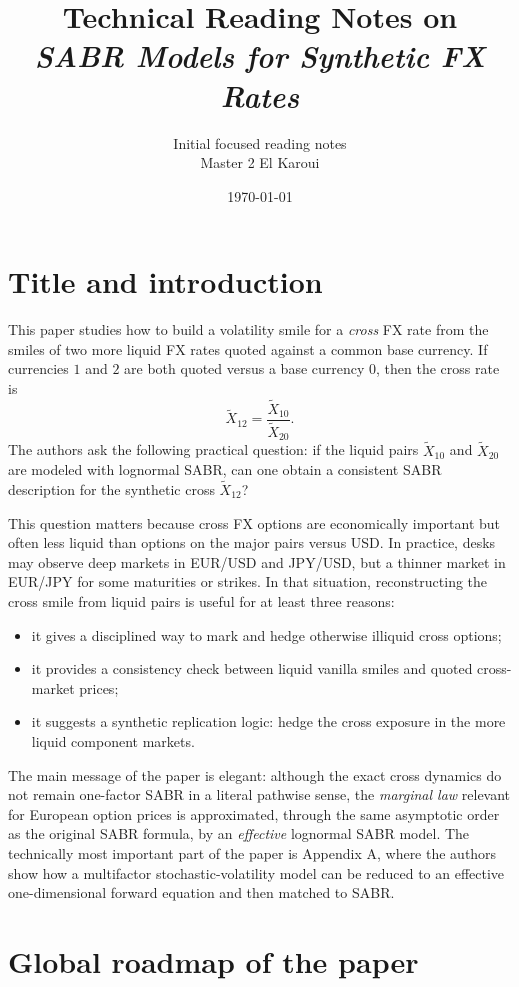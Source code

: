 \documentclass[11pt]{article}
\title{\textbf{Technical Reading Notes on} \\[0.2em] \emph{SABR Models for Synthetic FX Rates}}
\author{Initial focused reading notes\\Master 2 El Karoui}
\date{\today}
\newcommand{\X}{\widetilde{X}}
\begin{document}
\maketitle
\tableofcontents

\section{Title and introduction}

This paper studies how to build a volatility smile for a \emph{cross} FX rate from the smiles of two more liquid FX rates quoted against a common base currency. If currencies \(1\) and \(2\) are both quoted versus a base currency \(0\), then the cross rate is
\[
\X_{12}=\frac{\X_{10}}{\X_{20}}.
\]
The authors ask the following practical question: if the liquid pairs \(\X_{10}\) and \(\X_{20}\) are modeled with lognormal SABR, can one obtain a consistent SABR description for the synthetic cross \(\X_{12}\)?

This question matters because cross FX options are economically important but often less liquid than options on the major pairs versus USD. In practice, desks may observe deep markets in EUR/USD and JPY/USD, but a thinner market in EUR/JPY for some maturities or strikes. In that situation, reconstructing the cross smile from liquid pairs is useful for at least three reasons:
\begin{itemize}
    \item it gives a disciplined way to mark and hedge otherwise illiquid cross options;
    \item it provides a consistency check between liquid vanilla smiles and quoted cross-market prices;
    \item it suggests a synthetic replication logic: hedge the cross exposure in the more liquid component markets.
\end{itemize}

The main message of the paper is elegant: although the exact cross dynamics do not remain one-factor SABR in a literal pathwise sense, the \emph{marginal law} relevant for European option prices is approximated, through the same asymptotic order as the original SABR formula, by an \emph{effective} lognormal SABR model. The technically most important part of the paper is Appendix A, where the authors show how a multifactor stochastic-volatility model can be reduced to an effective one-dimensional forward equation and then matched to SABR.

\section{Global roadmap of the paper}
\end{document}
